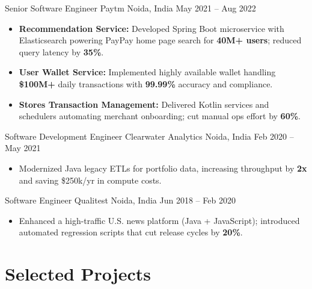 \documentclass[11pt,a4paper]{moderncv}
\begin{document}
    \cventry
    {Senior Software Engineer}
    {Paytm}
    {Noida, India}
    {May 2021 -- Aug 2022}
    {
        \begin{itemize}
            \item \textbf{Recommendation Service:} Developed Spring Boot microservice with Elasticsearch powering PayPay home page search for \textbf{40M+ users}; reduced query latency by \textbf{35\%}.
            \item \textbf{User Wallet Service:} Implemented highly available wallet handling \textbf{\$100M+} daily transactions with \textbf{99.99\%} accuracy and compliance.
            \item \textbf{Stores Transaction Management:} Delivered Kotlin services and schedulers automating merchant onboarding; cut manual ops effort by \textbf{60\%}.
        \end{itemize}
    }

    \cventry
    {Software Development Engineer}
    {Clearwater Analytics}
    {Noida, India}
    {Feb 2020 -- May 2021}
    {
        \begin{itemize}
            \item Modernized Java legacy ETLs for portfolio data, increasing throughput by \textbf{2x} and saving \$250k/yr in compute costs.
        \end{itemize}
    }

    \cventry
    {Software Engineer}
    {Qualitest}
    {Noida, India}
    {Jun 2018 -- Feb 2020}
    {
        \begin{itemize}
            \item Enhanced a high-traffic U.S. news platform (Java + JavaScript); introduced automated regression scripts that cut release cycles by \textbf{20\%}.
        \end{itemize}
    }

    \section{Selected Projects}
\end{document}
